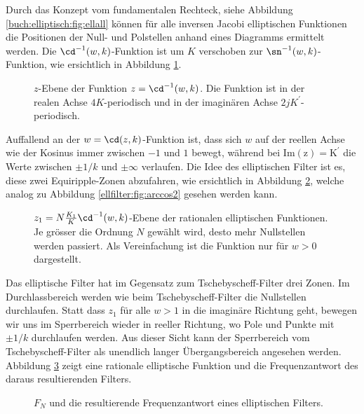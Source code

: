Durch das Konzept vom fundamentalen Rechteck, siehe Abbildung \ref{buch:elliptisch:fig:ellall} können für alle inversen Jacobi elliptischen Funktionen die Positionen der Null- und Polstellen anhand eines Diagramms ermittelt werden.
Die $\cd^{-1}(w, k)$-Funktion ist um $K$ verschoben zur $\sn^{-1}(w, k)$-Funktion, wie ersichtlich in Abbildung \ref{ellfilter:fig:cd}.
\begin{figure}
    \centering
    
    \caption{
        $z$-Ebene der Funktion $z = \cd^{-1}(w, k)$.
        Die Funktion ist in der realen Achse $4K$-periodisch und in der imaginären Achse $2jK^\prime$-periodisch.
    }
    \label{ellfilter:fig:cd}
\end{figure}
Auffallend an der $w = \cd(z, k)$-Funktion ist, dass sich $w$ auf der reellen Achse wie der Kosinus immer zwischen $-1$ und $1$ bewegt, während bei $\mathrm{Im(z) = K^\prime}$ die Werte zwischen $\pm 1/k$ und $\pm \infty$ verlaufen.
Die Idee des elliptischen Filter ist es, diese zwei Equiripple-Zonen abzufahren, wie ersichtlich in Abbildung \ref{ellfilter:fig:cd2}, welche analog zu Abbildung \ref{ellfilter:fig:arccos2} gesehen werden kann.
\begin{figure}
    \centering
    
    \caption{
        $z_1=N\frac{K_1}{K}\cd^{-1}(w, k)$-Ebene der rationalen elliptischen Funktionen.
        Je grösser die Ordnung $N$ gewählt wird, desto mehr Nullstellen werden passiert.
        Als Vereinfachung ist die Funktion nur für $w>0$ dargestellt.
    }
    \label{ellfilter:fig:cd2}
\end{figure}
Das elliptische Filter hat im Gegensatz zum Tschebyscheff-Filter drei Zonen.
Im Durchlassbereich werden wie beim Tschebyscheff-Filter die Nullstellen durchlaufen.
Statt dass $z_1$ für alle $w>1$ in die imaginäre Richtung geht, bewegen wir uns im Sperrbereich wieder in reeller Richtung, wo Pole und Punkte mit $\pm 1/k$ durchlaufen werden.
Aus dieser Sicht kann der Sperrbereich vom Tschebyscheff-Filter als unendlich langer Übergangsbereich angesehen werden.
Abbildung \ref{ellfilter:fig:elliptic_freq} zeigt eine rationale elliptische Funktion und die Frequenzantwort des daraus resultierenden Filters.
\begin{figure}
    \centering
    
    \caption{$F_N$ und die resultierende Frequenzantwort eines elliptischen Filters.}
    \label{ellfilter:fig:elliptic_freq}
\end{figure}

